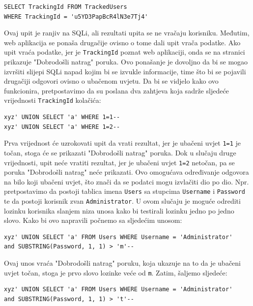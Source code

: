 \documentclass[12pt, oneside, onecolumn]{book}
\begin{document}
{\begin{verbatim}
SELECT TrackingId FROM TrackedUsers 
WHERE TrackingId = 'u5YD3PapBcR4lN3e7Tj4'
\end{verbatim}

Ovaj upit je ranjiv na SQLi, ali rezultati upita se ne vračaju korisniku. Međutim, web aplikacija se ponaša drugačije ovisno o tome dali upit vrača podatke. Ako upit vraća podatke, jer je \texttt{TrackingId} poznat web aplikaciji, onda se na stranici prikazuje "Dobrodošli natrag" poruka. Ovo ponašanje je dovoljno da bi se mogao izvršiti slijepi SQLi napad kojim bi se izvukle informacije, time što bi se pojavili drugačiji odgovori ovisno o ubačenom uvjetu. Da bi se vidjelo kako ovo funkcionira, pretpostavimo da su poslana dva zahtjeva koja sadrže sljedeće vrijednosti \texttt{TrackingId} kolačića:

\begin{verbatim}
xyz' UNION SELECT 'a' WHERE 1=1--
xyz' UNION SELECT 'a' WHERE 1=2--
\end{verbatim}

Prva vrijednost će uzrokovati upit da vrati rezultat, jer je ubačeni uvjet \texttt{1=1} je točan, stoga će se prikazati "Dobrodošli natrag" poruka. Dok u slučaju druge vrijednosti, upit neće vratiti rezultat, jer je ubačeni uvjet \texttt{1=2} netočan, pa se poruka "Dobrodošli natrag" neće prikazati. Ovo omogućava određivanje odgovora na bilo koji ubačeni uvjet, što znači da se podatci mogu izvlačiti dio po dio. Npr. pretpostavimo da postoji tablica imena \texttt{Users} sa stupcima \texttt{Username} i \texttt{Password} te da postoji korisnik zvan \texttt{Administrator}. U ovom slučaju je moguće odrediti lozinku korisnika slanjem niza unosa kako bi testirali lozinku jedno po jedno slovo. Kako bi ovo napravili počnemo sa sljedećim unosom:

\begin{verbatim}
xyz' UNION SELECT 'a' FROM Users WHERE Username = 'Administrator' 
and SUBSTRING(Password, 1, 1) > 'm'--
\end{verbatim}

Ovaj unos vraća "Dobrodošli natrag" poruku, koja ukazuje na to da je ubačeni uvjet točan, stoga je prvo slovo lozinke veće od \texttt{m}. Zatim, šaljemo sljedeće:

\begin{verbatim}
xyz' UNION SELECT 'a' FROM Users WHERE Username = 'Administrator' 
and SUBSTRING(Password, 1, 1) > 't'--
\end{verbatim}

}
\end{document}
